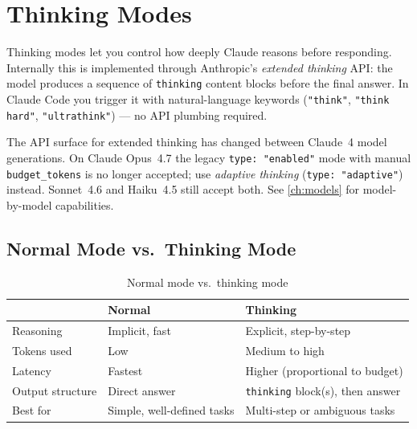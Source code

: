 \chapter{Thinking Modes}
\label{ch:thinking}


Thinking modes let you control how deeply Claude reasons before responding.
Internally this is implemented through Anthropic's \emph{extended thinking}
API: the model produces a sequence of \texttt{thinking} content blocks before
the final answer. In Claude Code you trigger it with natural-language
keywords (\texttt{"think"}, \texttt{"think hard"}, \texttt{"ultrathink"}) —
no API plumbing required.

\begin{warningbox}
The API surface for extended thinking has changed between Claude~4 model
generations. On Claude Opus~4.7 the legacy \texttt{type: "enabled"} mode with
manual \texttt{budget\_tokens} is no longer accepted; use \emph{adaptive
thinking} (\texttt{type: "adaptive"}) instead. Sonnet~4.6 and Haiku~4.5 still
accept both. See \cref{ch:models} for model-by-model capabilities.
\end{warningbox}

\section{Normal Mode vs.\ Thinking Mode}
\label{sec:thinking-overview}

\begin{table}[ht]
\centering
\caption{Normal mode vs.\ thinking mode}
\label{tab:thinking-modes}
\begin{tabularx}{\textwidth}{lXX}
\toprule
                  & \textbf{Normal} & \textbf{Thinking} \\
\midrule
Reasoning         & Implicit, fast             & Explicit, step-by-step \\
Tokens used       & Low                        & Medium to high \\
Latency           & Fastest                    & Higher (proportional to budget) \\
Output structure  & Direct answer              & \texttt{thinking} block(s), then answer \\
Best for          & Simple, well-defined tasks & Multi-step or ambiguous tasks \\
\bottomrule
\end{tabularx}
\end{table}


